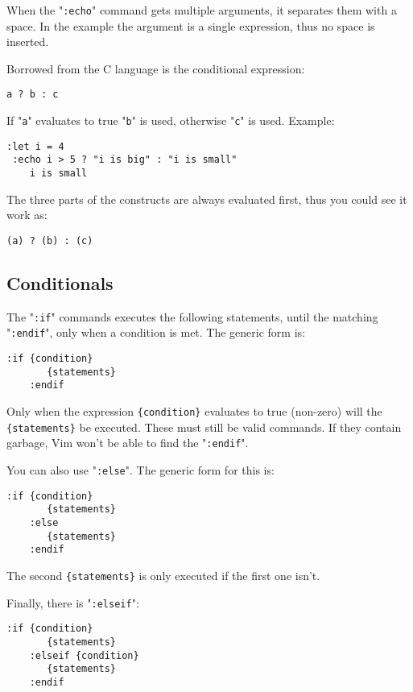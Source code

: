 When the "\verb!:echo!" command gets multiple arguments, it separates them with a space.
In the example the argument is a single expression, thus no space is inserted.

Borrowed from the C language is the conditional expression:

\begin{Verbatim}[samepage=true]
    a ? b : c
\end{Verbatim}

If "\verb!a!" evaluates to true "\verb!b!" is used, otherwise "\verb!c!" is used.
Example:

\begin{Verbatim}[samepage=true]
 :let i = 4
 :echo i > 5 ? "i is big" : "i is small"
    i is small
\end{Verbatim}

The three parts of the constructs are always evaluated first, thus you could see it work as:

\begin{Verbatim}[samepage=true]
    (a) ? (b) : (c)
\end{Verbatim}
\subsection{Conditionals}
The "\verb!:if!" commands executes the following statements, until the matching "\verb!:endif!", only when a condition is met.
The generic form is:

\begin{Verbatim}[samepage=true]
    :if {condition}
       {statements}
    :endif
\end{Verbatim}

Only when the expression \verb!{condition}! evaluates to true (non-zero) will the \verb!{statements}! be executed.
These must still be valid commands.
If they contain garbage, Vim won't be able to find the "\verb!:endif!".

You can also use "\verb!:else!".
The generic form for this is:

\begin{Verbatim}[samepage=true]
    :if {condition}
       {statements}
    :else
       {statements}
    :endif
\end{Verbatim}

The second \verb!{statements}! is only executed if the first one isn't.

Finally, there is "\verb!:elseif!":

\begin{Verbatim}[samepage=true]
    :if {condition}
       {statements}
    :elseif {condition}
       {statements}
    :endif
\end{Verbatim}

